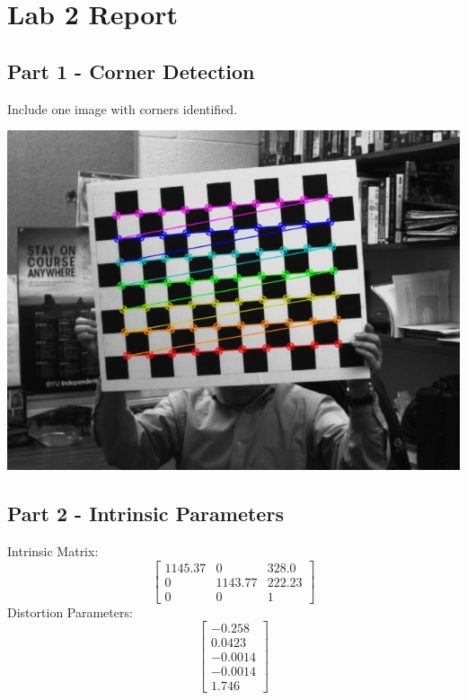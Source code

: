 \documentclass[12pt,a4paper,final]{article}
\begin{document}
\section*{Lab 2 Report}

\subsection*{Part 1 - Corner Detection}
Include one image with corners identified. 

\includegraphics[scale=0.25]{Task_1}

\subsection*{Part 2 - Intrinsic Parameters}
Intrinsic Matrix:
\begin{equation*}
\begin{bmatrix}
1145.37 & 0 & 328.0 \\ 0 & 1143.77 & 222.23 \\ 0 & 0 & 1
\end{bmatrix}
\end{equation*}
Distortion Parameters:
\begin{equation*}
\begin{bmatrix}
-0.258 \\ 0.0423 \\ -0.0014 \\ -0.0014 \\1.746
\end{bmatrix}
\end{equation*}
\end{document}

